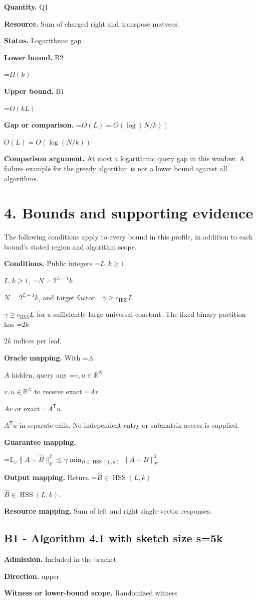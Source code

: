 \documentclass[10pt,a4paper]{article}
\newcommand{\AtlasMath}[1]{\par\begingroup\centering\setbox0=\hbox{$\displaystyle #1$}\ifdim\wd0>1.4\linewidth\typeout{ATLAS WIDE FORMULA: \the\wd0}\fi\ifdim\wd0>\linewidth\resizebox{\linewidth}{!}{\box0}\else\box0\fi\par\endgroup}
\newcommand{\AtlasInlineMath}[1]{\begingroup\setbox0=\hbox{$#1$}\ifdim\wd0>.4\linewidth\endgroup\AtlasMath{#1}\else\endgroup$#1$\fi}
\begin{document}
\textbf{Quantity.} Q1

\textbf{Resource.} Sum of charged right and transpose matvecs.

\textbf{Status.} Logarithmic gap

\textbf{Lower bound.} B2

\AtlasMath{\Omega(k)}
\textbf{Upper bound.} B1

\AtlasMath{O(kL)}
\textbf{Gap or comparison.} \AtlasInlineMath{O(L)=O(\log(N/k))}

\textbf{Comparison argument.} At most a logarithmic query gap in this window. A failure example for the greedy algorithm is not a lower bound against all algorithms.

\section{4. Bounds and supporting evidence}
The following conditions apply to every bound in this profile, in addition to each bound's stated region and algorithm scope.

\textbf{Conditions.} Public integers \AtlasInlineMath{L,k\ge1}, \AtlasInlineMath{N=2^{L+1}k}, and target factor \AtlasInlineMath{\gamma\ge c_{\mathrm{HSS}}L} for a sufficiently large universal constant. The fixed binary partition has \AtlasInlineMath{2k} indices per leaf.

\textbf{Oracle mapping.} With \AtlasInlineMath{A} hidden, query any \AtlasInlineMath{v,u\in\mathbb R^N} to receive exact \AtlasInlineMath{Av} or exact \AtlasInlineMath{A^{\mathsf T}u} in separate calls. No independent entry or submatrix access is supplied.

\textbf{Guarantee mapping.}

\AtlasMath{\mathbb{E}_{\omega}\|A-\widehat B\|_F^2\le\gamma\min_{B\in\operatorname{HSS}(L,k)}\|A-B\|_F^2}
\textbf{Output mapping.} Return \AtlasInlineMath{\widehat B\in\operatorname{HSS}(L,k)}.

\textbf{Resource mapping.} Sum of left and right single-vector responses.

\subsection{B1 - Algorithm 4.1 with sketch size s=5k}
\textbf{Admission.} Included in the bracket

\textbf{Direction.} upper

\textbf{Witness or lower-bound scope.} Randomized witness
\end{document}
